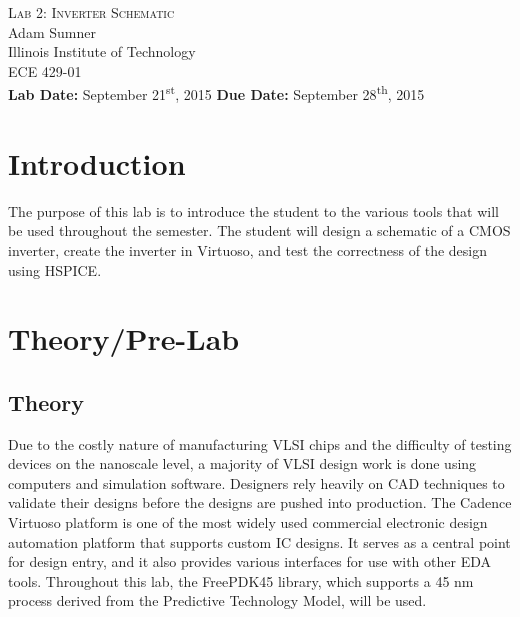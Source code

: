 \documentclass[12pt]{article}
\begin{document}
\begin{titlepage}
	\begin{center}
		
		
		\vfill
		
		\textsc{\LARGE Lab 2: Inverter Schematic}\\[1.5cm]
		
		\Large Adam Sumner\\[0.5cm]
		
		\Large Illinois Institute of Technology\\[0.5cm]
		
		\Large ECE 429-01\\[0.5cm]	
		
		\noindent
		\vfill
		\large \textbf{Lab Date:} September 21\textsuperscript{st}, 2015\hfill
		\large \textbf{Due Date:} September 28\textsuperscript{th}, 2015
		
		
	\end{center}
\end{titlepage}

\section{Introduction}
The purpose of this lab is to introduce the student to the various tools that will be used throughout the semester. The student will design a schematic of a CMOS inverter, create the inverter in Virtuoso, and test the correctness of the design using HSPICE.

\section{Theory/Pre-Lab}
\subsection{Theory}
Due to the costly nature of manufacturing VLSI chips and the difficulty of testing devices on the nanoscale level, a majority of VLSI design work is done using computers and simulation  software. Designers rely heavily on CAD techniques to validate their designs before the designs are pushed into production. The Cadence Virtuoso platform is one of the most widely used commercial electronic design automation platform that supports custom IC designs. It serves as a central point for design entry, and it also provides various interfaces for use with other EDA tools. Throughout this lab, the FreePDK45 library, which supports a 45 nm process derived from the Predictive Technology Model, will be used.
\end{document}
